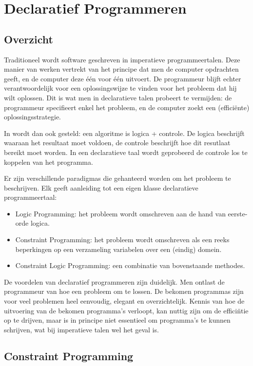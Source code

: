\chapter{Declaratief Programmeren} \label{chap:decl}

\section{Overzicht} \label{sec:decl-overz}

Traditioneel wordt software geschreven in imperatieve programmeertalen. Deze manier van werken vertrekt van het principe dat men de computer opdrachten geeft, en de computer deze \'e\'en voor \'e\'en uitvoert. De programmeur blijft echter verantwoordelijk voor een oplossingswijze te vinden voor het probleem dat hij wilt oplossen. Dit is wat men in declaratieve talen probeert te vermijden: de programmeur specifieert enkel het probleem, en de computer zoekt een (effici\"ente) oplossingsstrategie.

In \cite{kowalski} wordt dan ook gesteld: een algoritme is logica + controle. De logica beschrijft waaraan het resultaat moet voldoen, de controle beschrijft hoe dit resutlaat bereikt moet worden. In een declaratieve taal wordt geprobeerd de controle los te koppelen van het programma.

Er zijn verschillende paradigmas die gehanteerd worden om het probleem te beschrijven. Elk geeft aanleiding tot een eigen klasse declaratieve programmeertaal: \begin{itemize}
\item Logic Programming: het probleem wordt omschreven aan de hand van eerste-orde logica.
\item Constraint Programming: het probleem wordt omschreven als een reeks beperkingen op een verzameling variabelen over een (eindig) domein.
\item Constraint Logic Programming: een combinatie van bovenstaande methodes.
\end{itemize}

De voordelen van declaratief programmeren zijn duidelijk. Men ontlast de programmeur van hoe een probleem om te lossen. De bekomen programmas zijn voor veel problemen heel eenvoudig, elegant en overzichtelijk. Kennis van hoe de uitvoering van de bekomen programma's verloopt, kan nuttig zijn om de effici\"ntie op te drijven, maar is in principe niet essentieel om programma's te kunnen schrijven, wat bij imperatieve talen wel het geval is.

\section{Constraint Programming}

